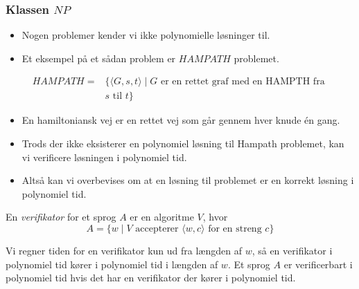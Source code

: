 \begin{frame}[allowframebreaks]
	\frametitle{Klassen $NP$}
	\begin{itemize}
		\item Nogen problemer kender vi ikke polynomielle løsninger til.
		\item Et eksempel på et sådan problem er $HAMPATH$ problemet.
	\end{itemize}

	\begin{align*}
		HAMPATH = & \{\langle G, s, t \rangle \mid G \text{ er en rettet graf med en HAMPTH fra } \\
		          & s \text{ til } t\}
	\end{align*}

	\begin{itemize}
		\item En hamiltoniansk vej er en rettet vej som går gennem hver knude én gang.
		\item Trods der ikke eksisterer en polynomiel løsning til Hampath problemet, kan vi verificere løsningen i polynomiel tid.
		\item Altså kan vi overbevises om at en løsning til problemet er en korrekt løsning i polynomiel tid.
	\end{itemize}

	\begin{definition}
		En \textit{verifikator} for et sprog $A$ er en algoritme $V$, hvor
		\begin{equation*}
			A = \{w \mid V \text{ accepterer } \langle w, c \rangle \text{ for en streng }c\}
		\end{equation*}

		Vi regner tiden for en verifikator kun ud fra længden af $w$, så en verifikator i polynomiel tid kører i polynomiel tid i længden af $w$. Et sprog $A$ er verificerbart i polynomiel tid hvis det har en verifikator der kører i polynomiel tid.
	\end{definition}


\end{frame}
